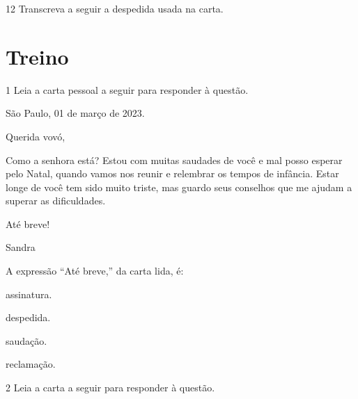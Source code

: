 \num{12} Transcreva a seguir a despedida usada na carta. 


\pagebreak
\section*{Treino}

\num{1} Leia a carta pessoal a seguir para responder à questão.


\begin{mdframed}[linewidth=10pt,linecolor=salmao!20,backgroundcolor=salmao!20,roundcorner=20pt]
\begin{flushright}
São Paulo, 01 de março de 2023.
\end{flushright}

Querida vovó,

Como a senhora está? Estou com muitas saudades de você e mal posso
esperar pelo Natal, quando vamos nos reunir e relembrar os tempos de
infância. Estar longe de você tem sido muito triste, mas guardo seus
conselhos que me ajudam a superar as dificuldades.

\begin{flushright}
Até breve!

Sandra
\end{flushright}

\end{mdframed}

A expressão ``Até breve,'' da carta lida, é:

\begin{escolha}
\item assinatura.

\item despedida.

\item saudação.

\item reclamação.
\end{escolha}

\num{2} Leia a carta a seguir para responder à questão.


